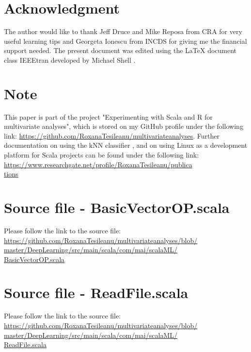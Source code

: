 \documentclass[twoside, 11p]{article}
\begin{document}
\section*{Acknowledgment}
The author would like to thank Jeff Druce and Mike Reposa from CRA for very useful learning tips and Georgeta Ionescu from INCDS for giving me the financial support needed. The present document was edited using the LaTeX document class IEEEtran developed by Michael Shell \cite{shell_how_nodate}.  

\section*{Note}
This paper is part of the project "Experimenting with Scala and R for multivariate analyses", which  is stored on my GitHub profile under the following link: \href{https://github.com/RoxanaTesileanu/multivariate_analyses}{https://github.com/RoxanaTesileanu/multivariate\underline{\space}analyses}. Further documentation on using the kNN classifier \cite{tesileanu_introduction_2017}, and on using Linux as a development platform for Scala projects \cite{tesileanu_using_2017} can be found under the following link: \href{https://www.researchgate.net/profile/Roxana_Tesileanu/publications}{https://www.researchgate.net/profile/Roxana\underline{\space}Tesileanu/publica\\tions}  

\appendices
\section{Source file - BasicVectorOP.scala}

Please follow the link to the source file:\\
\href{https://github.com/RoxanaTesileanu/multivariate_analyses/blob/master/DeepLearning/src/main/scala/com/mai/scalaML/BasicVectorOP.scala}{https://github.com/RoxanaTesileanu/multivariate\underline{\space}analyses/blob/\\master/DeepLearning/src/main/scala/com/mai/scalaML/\\BasicVectorOP.scala}

\section{Source file - ReadFile.scala}

Please follow the link to the source file:\\
\href{https://github.com/RoxanaTesileanu/multivariate_analyses/blob/master/DeepLearning/src/main/scala/com/mai/scalaML/ReadFile.scala}{https://github.com/RoxanaTesileanu/multivariate\underline{\space}analyses/blob/\\master/DeepLearning/src/main/scala/com/mai/scalaML/\\ReadFile.scala} 
\end{document}
